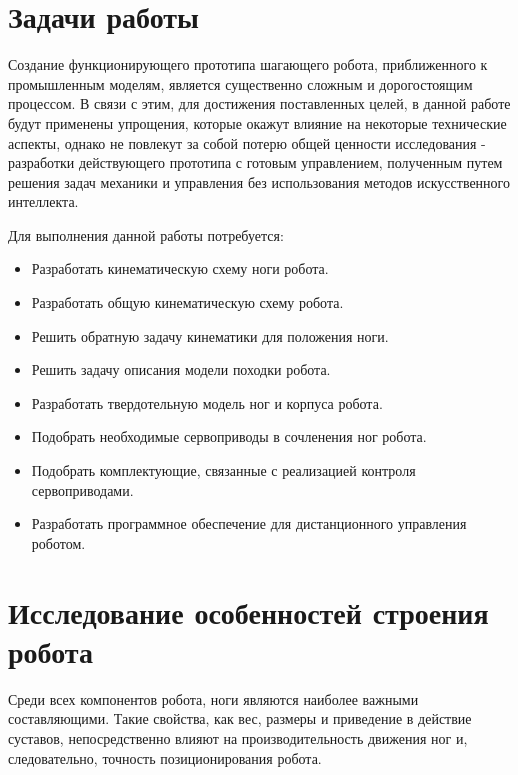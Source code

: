 \section{Задачи работы}\label{C1_1}

Создание функционирующего прототипа шагающего робота, приближенного к промышленным моделям, является существенно сложным и дорогостоящим процессом. В связи с этим, для достижения поставленных целей, в данной работе будут применены упрощения, которые окажут влияние на некоторые технические аспекты, однако не повлекут за собой потерю общей ценности исследования - разработки действующего прототипа с готовым управлением, полученным путем решения задач механики и управления без использования методов искусственного интеллекта.


 
Для выполнения данной работы потребуется:
\begin{itemize}
	\item Разработать кинематическую схему ноги робота.
	\item Разработать общую кинематическую схему робота.
	\item Решить обратную задачу кинематики для положения ноги.
	\item Решить задачу описания модели походки робота.
	\item Разработать твердотельную модель ног и корпуса робота.
	\item Подобрать необходимые сервоприводы в сочленения ног робота.
	\item Подобрать комплектующие, связанные с реализацией контроля сервоприводами.
	\item Разработать программное обеспечение для дистанционного управления роботом.
\end{itemize}
\section{Исследование особенностей строения робота}\label{C1_2}
Среди всех компонентов робота, ноги являются наиболее важными составляющими. Такие свойства, как вес, размеры и приведение в действие суставов, непосредственно влияют на производительность движения ног и, следовательно, точность позиционирования робота.

